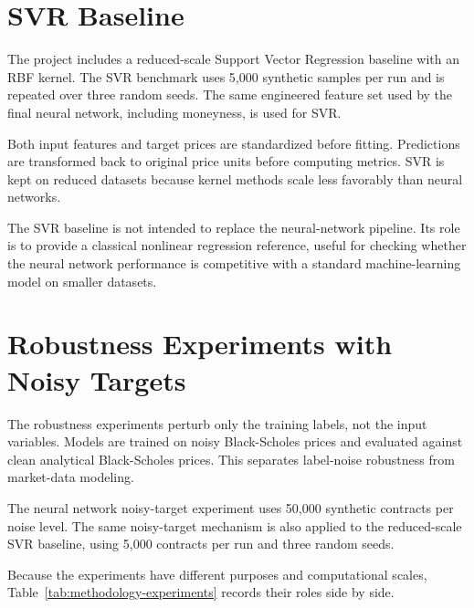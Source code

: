 \section{SVR Baseline}

The project includes a reduced-scale Support Vector Regression baseline with an RBF kernel.
The SVR benchmark uses 5,000 synthetic samples per run and is repeated over three random seeds.
The same engineered feature set used by the final neural network, including moneyness, is used for SVR.

Both input features and target prices are standardized before fitting.
Predictions are transformed back to original price units before computing metrics.
SVR is kept on reduced datasets because kernel methods scale less favorably than neural networks.

The SVR baseline is not intended to replace the neural-network pipeline.
Its role is to provide a classical nonlinear regression reference, useful for checking whether the neural network performance is competitive with a standard machine-learning model on smaller datasets.

\section{Robustness Experiments with Noisy Targets}

The robustness experiments perturb only the training labels, not the input variables.
Models are trained on noisy Black-Scholes prices and evaluated against clean analytical Black-Scholes prices.
This separates label-noise robustness from market-data modeling.

The neural network noisy-target experiment uses 50,000 synthetic contracts per noise level.
The same noisy-target mechanism is also applied to the reduced-scale SVR baseline, using 5,000 contracts per run and three random seeds.

Because the experiments have different purposes and computational scales, Table~\ref{tab:methodology-experiments} records their roles side by side.

